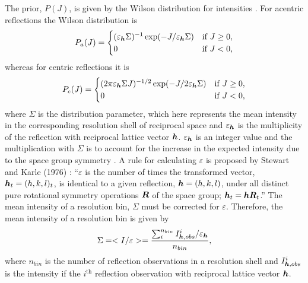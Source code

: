 The prior, $P(J)$, is given by the Wilson distribution for intensities \cite{wilson1949probability}.
For acentric reflections the Wilson distribution is
\begin{equation}
    P_a(J) =
    \begin{cases}
        (\varepsilon_{\boldsymbol{h}}\Sigma)^{-1} \exp(-J/\varepsilon_{\boldsymbol{h}}\Sigma) & \mbox{if } J \ge 0, \\
        0                           & \mbox{if } J < 0,
    \end{cases}
    \label{eq:Wilson Distribution for acentric reflections - Intensities}
\end{equation}
whereas for centric reflections it is
\begin{equation}
    P_c(J) =
    \begin{cases}
        (2\pi\varepsilon_{\boldsymbol{h}}\Sigma J)^{-1/2} \exp(-J/2\varepsilon_{\boldsymbol{h}}\Sigma) & \mbox{if } J \ge 0, \\
        0                                      & \mbox{if } J < 0,
    \end{cases}
    \label{eq:Wilson Distribution for centric reflections - Intensities}
\end{equation}
where $\Sigma$ is the distribution parameter, which here represents the mean intensity in the corresponding resolution shell of reciprocal space and $\varepsilon_{\boldsymbol{h}}$ is the multiplicity of the reflection with reciprocal lattice vector $\boldsymbol{h}$. $\varepsilon_{\boldsymbol{h}}$ is an integer value and the multiplication with $\Sigma$ is to account for the increase in the expected intensity due to the space group symmetry \cite{blessing1998intensity}. A rule for calculating $\varepsilon$ is proposed by Stewart and Karle (1976) \cite{stewart1976}: ``$\varepsilon$ is the number of times the transformed vector, $\boldsymbol{h}_t = (h,k,l)_t$, is identical to a given reflection, $\boldsymbol{h} = (h,k,l)$, under all distinct pure rotational symmetry operations $\boldsymbol{R}$ of the space group; $\boldsymbol{h}_t = \boldsymbol{h}\boldsymbol{R}_t$.''
The mean intensity of a resolution bin, $\Sigma$ must be corrected for $\varepsilon$.
Therefore, the mean intensity of a resolution bin is given by
\begin{equation}
    \Sigma = <I/\varepsilon> = \frac{\sum^{n_{bin}}_i I^i_{\boldsymbol{h},obs}/\varepsilon_{\boldsymbol{h}}}{n_{bin}},
    \label{eq:Mean intensity of resolution bin}
\end{equation}
where $n_{bin}$ is the number of reflection observations in a resolution shell and $I^i_{\boldsymbol{h},obs}$ is the intensity if the $i^{\text{th}}$ reflection observation with reciprocal lattice vector $\boldsymbol{h}$.

